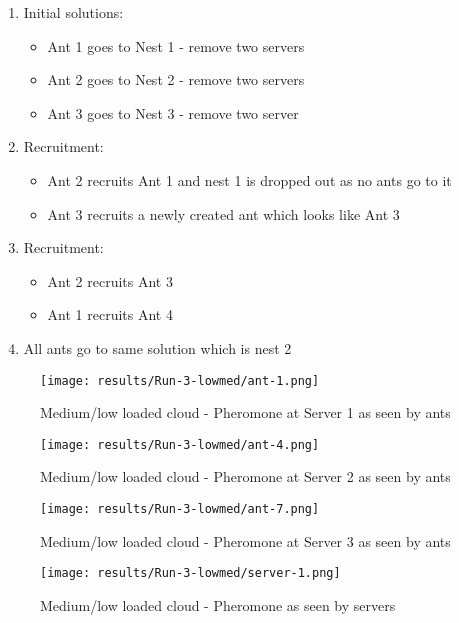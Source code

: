 \begin{enumerate}
	\item Initial solutions: 
	\begin{itemize}
		\item Ant 1 goes to Nest 1 - remove two servers
		\item Ant 2 goes to Nest 2 - remove two servers
		\item Ant 3 goes to Nest 3 - remove two server
	\end{itemize}
	\item Recruitment:
	\begin{itemize}
		\item Ant 2 recruits Ant 1 and nest 1 is dropped out as no ants go to it
		\item Ant 3 recruits a newly created ant which looks like Ant 3
	\end{itemize}
	\item Recruitment:
	\begin{itemize}
		\item Ant 2 recruits Ant 3
		\item Ant 1 recruits Ant 4
	\end{itemize}
	\item All ants go to same solution which is nest 2
\end{enumerate}

\begin{figure}[!ht]
	\centering
		\texttt{[image: results/Run-3-lowmed/ant-1.png]}
	\caption{Medium/low loaded cloud - Pheromone at Server 1 as seen by ants}
	\label{fig:3serv-ant1-lowmed}
\end{figure}

\begin{figure}
	\centering
		\texttt{[image: results/Run-3-lowmed/ant-4.png]}
	\caption{Medium/low loaded cloud - Pheromone at Server 2 as seen by ants}
	\label{fig:3serv-ant4-lowmed}
\end{figure}

\begin{figure}
	\centering
		\texttt{[image: results/Run-3-lowmed/ant-7.png]}
	\caption{Medium/low loaded cloud - Pheromone at Server 3 as seen by ants}
	\label{fig:3serv-ant7-lowmed}
\end{figure}

\begin{figure}
	\centering
		\texttt{[image: results/Run-3-lowmed/server-1.png]}
	\caption{Medium/low loaded cloud - Pheromone as seen by servers}
	\label{fig:3serv-pher-lowmed}
\end{figure}

